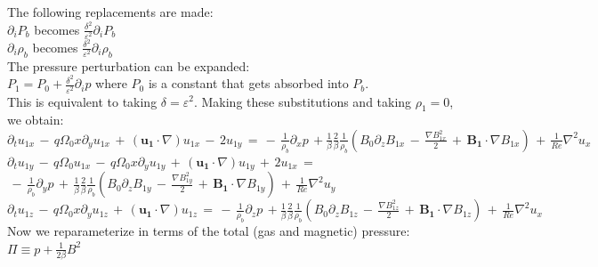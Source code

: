 \documentclass[letterpaper,12pt]{article}
\newcommand\reye{\mathrel{Re}}
\begin{document}
The following replacements are made: \\

\noindent $\partial_i P_b$ becomes $\frac{\delta^2}{\varepsilon^2} \partial_i P_b $ \\
$\partial_i \rho_b$ becomes $\frac{\delta^2}{\varepsilon^2} \partial_i \rho_b $ \\

The pressure perturbation can be expanded: \\

$P_1 = P_0 + \frac{\delta^2}{\varepsilon^2}\partial_i p$ where $P_0$ is a constant that gets absorbed into $P_b$. \\

This is equivalent to taking $\delta = \varepsilon^2$. Making these substitutions and taking $\rho_1 = 0$, we obtain: \\

$\partial_t u_{1x} \, - \, q \Omega_0 x \partial_y u_{1x} \,+ \, \left(\mathbf{u_1} \cdot \nabla\right)u_{1x} \, - \, 2 u_{1y}\,= \, - \, \frac{1}{\rho_b}\partial_x p  \, + \frac{1}{\beta} \frac{2}{\beta} \frac{1}{\rho_b} \left( B_0 \partial_z B_{1x} \,- \, \frac{\nabla B_{1x}^2}{2} \, + \, \mathbf{B_1}\cdot \nabla B_{1x} \right) \, + \, \frac{1}{\reye}\nabla^2 u_x  $ \\

$\partial_t u_{1y}\, - \, q \Omega_0 u_{1x}  \, - \, q \Omega_0 x \partial_y u_{1y} \,+ \, \left(\mathbf{u_1} \cdot \nabla\right)u_{1y} \,+ \, 2u_{1x} \, =  $\\
$\, - \, \frac{1}{\rho_b}\partial_y p \, + \,  \frac{1}{\beta} \frac{2}{\beta} \frac{1}{\rho_b} \left( B_0 \partial_z B_{1y} \,- \, \frac{\nabla B_{1y}^2}{2} \, + \, \mathbf{B_1}\cdot \nabla B_{1y} \right) \, + \, \frac{1}{\reye}\nabla^2 u_y  $ \\

$\partial_t u_{1z} \, - \, q \Omega_0 x \partial_y u_{1z} \,+ \, \left(\mathbf{u_1} \cdot \nabla\right)u_{1z} \, = \, - \, \frac{1}{\rho_b}\partial_z p  \, + \frac{1}{\beta} \frac{2}{\beta} \frac{1}{\rho_b} \left( B_0 \partial_z B_{1z} \,- \, \frac{\nabla B_{1z}^2}{2} \, + \, \mathbf{B_1}\cdot \nabla B_{1z} \right) \, + \, \frac{1}{\reye}\nabla^2 u_x  $ \\

Now we reparameterize in terms of the total (gas and magnetic) pressure: \\

$\Pi \equiv p + \frac{1}{2\beta} B^2$ \\
\end{document}
